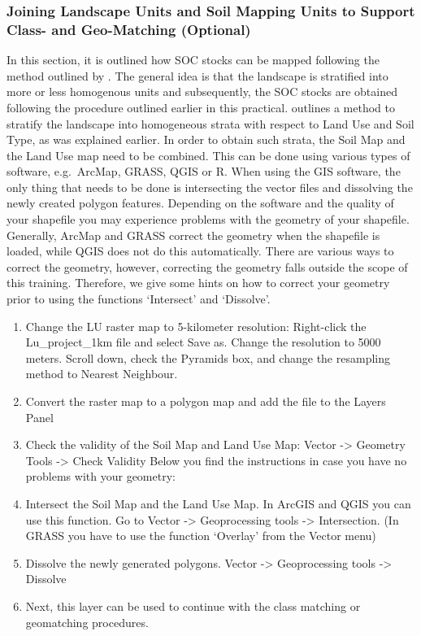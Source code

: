 \documentclass[10pt,b5paper,]{book}
\providecommand{\tightlist}{%
  \setlength{\itemsep}{0pt}\setlength{\parskip}{0pt}}
\theoremstyle{definition}
\theoremstyle{definition}
\theoremstyle{definition}
\theoremstyle{remark}
\begin{document}
\hypertarget{joining-landscape-units-and-soil-mapping-units-to-support-class--and-geo-matching-optional}{%
\subsubsection{Joining Landscape Units and Soil Mapping Units to Support
Class- and Geo-Matching
(Optional)}\label{joining-landscape-units-and-soil-mapping-units-to-support-class--and-geo-matching-optional}}

In this section, it is outlined how SOC stocks can be mapped following
the method outlined by \cite{lettens2004soil}. The general idea is that
the landscape is stratified into more or less homogenous units and
subsequently, the SOC stocks are obtained following the procedure
outlined earlier in this practical. \cite{lettens2004soil} outlines a
method to stratify the landscape into homogeneous strata with respect to
Land Use and Soil Type, as was explained earlier. In order to obtain
such strata, the Soil Map and the Land Use map need to be combined. This
can be done using various types of software, e.g.~ArcMap, GRASS, QGIS or
R. When using the GIS software, the only thing that needs to be done is
intersecting the vector files and dissolving the newly created polygon
features. Depending on the software and the quality of your shapefile
you may experience problems with the geometry of your shapefile.
Generally, ArcMap and GRASS correct the geometry when the shapefile is
loaded, while QGIS does not do this automatically. There are various
ways to correct the geometry, however, correcting the geometry falls
outside the scope of this training. Therefore, we give some hints on how
to correct your geometry prior to using the functions `Intersect' and
`Dissolve'.

\begin{enumerate}
\def\labelenumi{\arabic{enumi}.}
\tightlist
\item
  Change the LU raster map to 5-kilometer resolution: Right-click the
  Lu\_project\_1km file and select Save as. Change the resolution to
  5000 meters. Scroll down, check the Pyramids box, and change the
  resampling method to Nearest Neighbour.
\item
  Convert the raster map to a polygon map and add the file to the Layers
  Panel
\item
  Check the validity of the Soil Map and Land Use Map: Vector
  -\textgreater{} Geometry Tools -\textgreater{} Check Validity Below
  you find the instructions in case you have no problems with your
  geometry:
\item
  Intersect the Soil Map and the Land Use Map. In ArcGIS and QGIS you
  can use this function. Go to Vector -\textgreater{} Geoprocessing
  tools -\textgreater{} Intersection. (In GRASS you have to use the
  function `Overlay' from the Vector menu)
\item
  Dissolve the newly generated polygons. Vector -\textgreater{}
  Geoprocessing tools -\textgreater{} Dissolve
\item
  Next, this layer can be used to continue with the class matching or
  geomatching procedures.
\end{enumerate}
\end{document}

